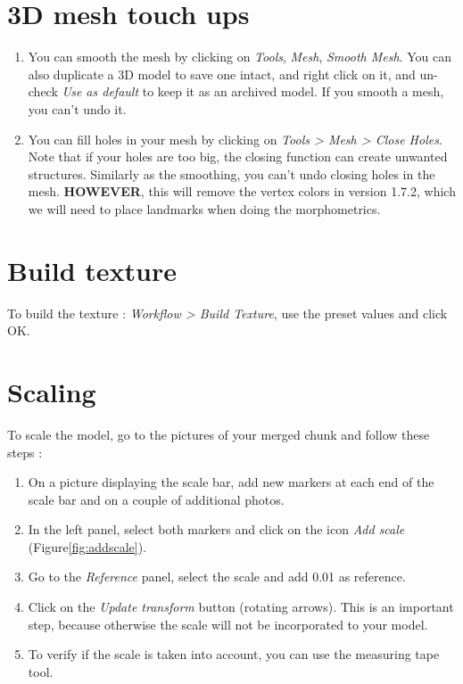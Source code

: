 \documentclass[
]{book}
\begin{document}
\hypertarget{d-mesh-touch-ups}{%
\section{3D mesh touch ups}\label{d-mesh-touch-ups}}

\begin{enumerate}
\def\labelenumi{\arabic{enumi}.}
\item
  You can smooth the mesh by clicking on \emph{Tools}, \emph{Mesh}, \emph{Smooth
  Mesh}. You can also duplicate a 3D model to save one intact, and
  right click on it, and un-check \emph{Use as default} to keep it as an
  archived model. If you smooth a mesh, you can't undo it.
\item
  You can fill holes in your mesh by clicking on \emph{Tools \textgreater{} Mesh \textgreater{}
  Close Holes}. Note that if your holes are too big, the closing
  function can create unwanted structures. Similarly as the smoothing,
  you can't undo closing holes in the mesh. \textbf{HOWEVER}, this will
  remove the vertex colors in version 1.7.2, which we will need to
  place landmarks when doing the morphometrics.
\end{enumerate}

\hypertarget{build-texture}{%
\section{Build texture}\label{build-texture}}

To build the texture : \emph{Workflow \textgreater{} Build Texture}, use the preset
values and click OK.

\hypertarget{scaling}{%
\section{Scaling}\label{scaling}}

To scale the model, go to the pictures of your merged chunk and follow
these steps :

\begin{enumerate}
\def\labelenumi{\arabic{enumi}.}
\item
  On a picture displaying the scale bar, add new markers at each end
  of the scale bar and on a couple of additional photos.
\item
  In the left panel, select both markers and click on the icon \emph{Add
  scale} (Figure\ref{fig:addscale}).
\item
  Go to the \emph{Reference} panel, select the scale and add 0.01 as
  reference.
\item
  Click on the \emph{Update transform} button (rotating arrows). This is an
  important step, because otherwise the scale will not be incorporated
  to your model.
\item
  To verify if the scale is taken into account, you can use the
  measuring tape tool.
\end{enumerate}
\end{document}
